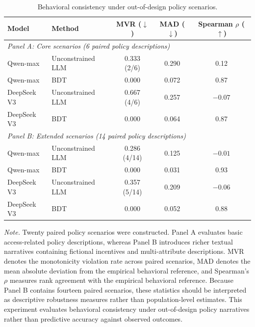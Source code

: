 \documentclass[11pt]{article}
\begin{document}
\begin{table}[t]
\centering
\caption{Behavioral consistency under out-of-design policy scenarios.}
\label{tab:out_of_design}
\small
\setlength{\tabcolsep}{4pt}
\begin{tabular}{@{}llccc@{}}
\toprule
Model & Method & MVR ($\downarrow$) & MAD ($\downarrow$) & Spearman $\rho$ ($\uparrow$)\\
\midrule

\multicolumn{5}{l}{\textit{Panel A: Core scenarios (6 paired policy descriptions)}}\\

Qwen-max
& Unconstrained LLM
& 0.333 (2/6)
& 0.290
& 0.12 \\

Qwen-max
& BDT
& 0.000
& 0.072
& 0.87 \\

DeepSeek V3
& Unconstrained LLM
& 0.667 (4/6)
& 0.257
& $-0.07$ \\

DeepSeek V3
& BDT
& 0.000
& 0.064
& 0.87 \\

\midrule

\multicolumn{5}{l}{\textit{Panel B: Extended scenarios (14 paired policy descriptions)}}\\

Qwen-max
& Unconstrained LLM
& 0.286 (4/14)
& 0.125
& $-0.01$ \\

Qwen-max
& BDT
& 0.000
& 0.031
& 0.93 \\

DeepSeek V3
& Unconstrained LLM
& 0.357 (5/14)
& 0.209
& $-0.06$ \\

DeepSeek V3
& BDT
& 0.000
& 0.052
& 0.88 \\

\bottomrule
\end{tabular}

\vspace{0.4em}

\begin{minipage}{0.95\textwidth}
\small
\textit{Note.}
Twenty paired policy scenarios were constructed. Panel A evaluates basic access-related policy descriptions, whereas Panel B introduces richer textual narratives containing fictional incentives and multi-attribute descriptions. MVR denotes the monotonicity violation rate across paired scenarios, MAD denotes the mean absolute deviation from the empirical behavioral reference, and Spearman's $\rho$ measures rank agreement with the empirical behavioral reference. Because Panel B contains fourteen paired scenarios, these statistics should be interpreted as descriptive robustness measures rather than population-level estimates. This experiment evaluates behavioral consistency under out-of-design policy narratives rather than predictive accuracy against observed outcomes.
\end{minipage}
\end{table}
\end{document}
